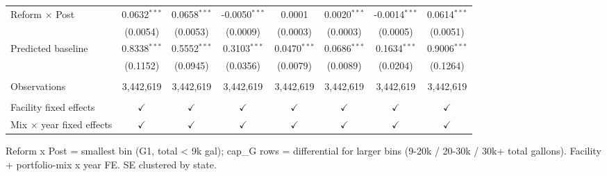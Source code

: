 \begin{tabular}{lccccccc}
   Reform $\times$ Post                                     & 0.0632$^{***}$  & 0.0658$^{***}$  & -0.0050$^{***}$                    & 0.0001                               & 0.0020$^{***}$                     & -0.0014$^{***}$ & 0.0614$^{***}$\\   
                                                            & (0.0054)        & (0.0053)        & (0.0009)                           & (0.0003)                             & (0.0003)                           & (0.0005)        & (0.0051)\\   
   Predicted baseline                                       & 0.8338$^{***}$  & 0.5552$^{***}$  & 0.3103$^{***}$                     & 0.0470$^{***}$                       & 0.0686$^{***}$                     & 0.1634$^{***}$  & 0.9006$^{***}$\\   
                                                            & (0.1152)        & (0.0945)        & (0.0356)                           & (0.0079)                             & (0.0089)                           & (0.0204)        & (0.1264)\\   
    \\
   Observations                                             & 3,442,619       & 3,442,619       & 3,442,619                          & 3,442,619                            & 3,442,619                          & 3,442,619       & 3,442,619\\  
    \\
   Facility fixed effects                                   & $\checkmark$    & $\checkmark$    & $\checkmark$                       & $\checkmark$                         & $\checkmark$                       & $\checkmark$    & $\checkmark$\\   
   Mix $\times$ year fixed effects                          & $\checkmark$    & $\checkmark$    & $\checkmark$                       & $\checkmark$                         & $\checkmark$                       & $\checkmark$    & $\checkmark$\\   
   \bottomrule
\end{tabular}
 
\par \raggedright 
Reform x Post = smallest bin (G1, total < 9k gal); cap\_G rows = differential for larger bins (9-20k / 20-30k / 30k+ total gallons). Facility + portfolio-mix x year FE. SE clustered by state.
\par\endgroup


